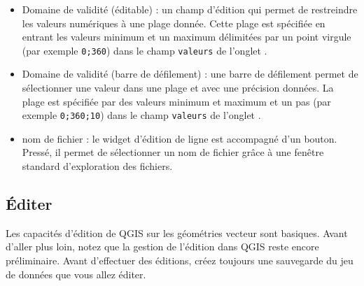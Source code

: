 \begin{itemize}
\item Domaine de validit\'e (\'editable) : un champ d'\'edition qui permet de restreindre les valeurs num\'eriques \`a une plage donn\'ee. Cette plage est sp\'ecifi\'ee en entrant les valeurs minimum et un maximum d\'elimit\'ees par un point virgule (par exemple \verb|0;360|) dans le champ \texttt{valeurs} de l'onglet .
\item Domaine de validit\'e (barre de d\'efilement) : une barre de d\'efilement permet de s\'electionner une valeur dans une plage et avec une pr\'ecision donn\'ees. La plage est sp\'ecifi\'ee par des valeurs minimum et maximum et un pas (par exemple \verb|0;360;10|) dans le champ \texttt{valeurs} de l'onglet .
\item nom de fichier : le widget d'\'edition de ligne est accompagn\'e d'un bouton. Press\'e, il permet de s\'electionner un nom de fichier gr\^ace \`a une fen\^etre standard d'exploration des fichiers.
\end{itemize}

\subsection{\'Editer}

Les capacit\'es d'\'edition de QGIS sur les g\'eom\'etries vecteur sont basiques. Avant d'aller plus loin, notez que la gestion de l'\'edition dans QGIS reste encore pr\'eliminaire. Avant d'effectuer des \'editions, cr\'eez toujours une sauvegarde du jeu de donn\'ees que vous allez \'editer.

